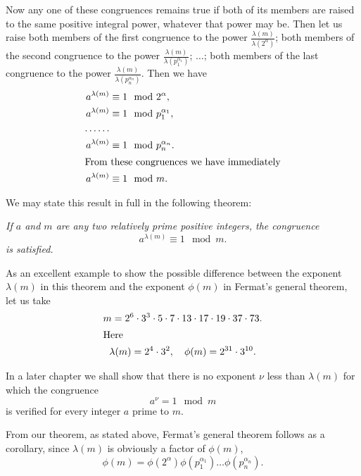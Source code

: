 Now any one of these congruences remains true if both of its members
are raised to the same positive integral power, whatever that power
may be. Then let us raise both members of the first congruence to
the power $\frac{\lambda(m)}{\lambda(2^\alpha)}$; both members of
the second congruence to the power
$\frac{\lambda(m)}{\lambda(p_1^{\alpha_1})}$; $\ldots$; both members
of the last congruence to the power
$\frac{\lambda(m)}{\lambda(p_n^{\alpha_n})}$. Then we have
\begin{align*}
a^{\lambda(m)} &\equiv 1 \mod 2^\alpha, \\
a^{\lambda(m)} &\equiv 1 \mod p_1^{\alpha_1}, \\
\ldots \ldots \\
a^{\lambda(m)} &\equiv 1 \mod p_n^{\alpha_n}. \\
\intertext{From these congruences we have immediately}
a^{\lambda(m)} &\equiv 1 \mod m.
\end{align*}

We may state this result in full in the following theorem:

\smallskip \emph{If $a$ and $m$ are any two relatively prime positive
integers, the congruence}
\begin{equation*}
a^{\lambda(m)} \equiv 1 \mod m.
\end{equation*}
\emph{is satisfied.}

As an excellent example to show the possible difference between the
exponent $\lambda(m)$ in this theorem and the exponent $\phi(m)$ in
Fermat's general theorem, let us take
\begin{gather*}
m = 2^6 \cdot 3^3 \cdot 5 \cdot 7 \cdot 13 \cdot 17 \cdot 19
        \cdot 37 \cdot 73. \\
\intertext{Here}
\lambda(m) = 2^4 \cdot 3^2, \quad \phi(m) = 2^{31} \cdot 3^{10}.
\end{gather*}

In a later chapter we shall show that there is no exponent $\nu$
less than $\lambda(m)$ for which the congruence
\begin{equation*}
a^\nu = 1 \mod m
\end{equation*}
is verified for every integer $a$ prime to $m$.

From our theorem, as stated above, Fermat's general theorem follows
as a corollary, since $\lambda(m)$ is obviously a factor of
$\phi(m)$,
\begin{equation*}
\phi(m) = \phi(2^\alpha) \phi(p_1^{\alpha_1}) \ldots
               \phi(p_n^{\alpha_n}).
\end{equation*}




